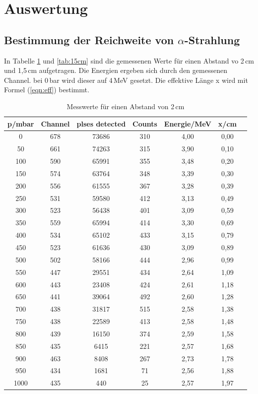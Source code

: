 
\section{Auswertung}
\subsection{Bestimmung der Reichweite von $\alpha$-Strahlung}
In Tabelle \ref{tab:2cm} und \ref{tab:15cm} sind die gemessenen Werte für einen
Abstand vo 2\,cm  und 1,5\,cm aufgetragen.
Die Energien ergeben sich durch den gemessenen Channel.
bei 0\,bar wird dieser auf 4\,MeV gesetzt.
Die effektive Länge x wird mit Formel (\ref{eqn:eff}) bestimmt.

\begin{table}
  \centering
  \caption{Messwerte für einen Abstand von 2\,cm}
  \label{tab:2cm}
  \begin{tabular}{c c c c c c c}
    \toprule
    p/mbar & Channel & plses detected & Counts & Energie/MeV & x/cm\\
    \midrule
    0   & 678 & 73686 & 310 & 4,00 & 0,00 \\
    50  & 661 & 74263 & 315 & 3,90 & 0,10 \\
    100 & 590 & 65991 & 355 & 3,48 & 0,20 \\
    150 & 574 & 63764 & 348 & 3,39 & 0,30 \\
    200 & 556 & 61555 & 367 & 3,28 & 0,39 \\
    250 & 531 & 59580 & 412 & 3,13 & 0,49 \\
    300 & 523 & 56438 & 401 & 3,09 & 0,59 \\
    350 & 559 & 65994 & 414 & 3,30 & 0,69 \\
    400 & 534 & 65102 & 433 & 3,15 & 0,79 \\
    450 & 523 & 61636 & 430 & 3,09 & 0,89 \\
    500 & 502 & 58166 & 444 & 2,96 & 0,99 \\
    550 & 447 & 29551 & 434 & 2,64 & 1,09 \\
    600 & 443 & 23408 & 424 & 2,61 & 1,18 \\
    650 & 441 & 39064 & 492 & 2,60 & 1,28 \\
    700 & 438 & 31817 & 515 & 2,58 & 1,38 \\
    750 & 438 & 22589 & 413 & 2,58 & 1,48 \\
    800 & 439 & 16150 & 374 & 2,59 & 1,58 \\
    850 & 435 & 6415  & 221 & 2,57 & 1,68 \\
    900 & 463 & 8408  & 267 & 2,73 & 1,78 \\
    950 & 434 & 1681  & 71  & 2,56 & 1,88 \\
    1000& 435 & 440   & 25  & 2,57 & 1,97 \\
    \bottomrule
  \end{tabular}
\end{table}

